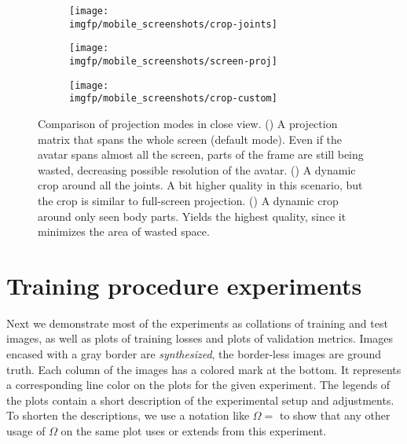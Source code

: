 \begin{figure}
	\centering
	\begin{subfigure}[b]{0.32\textwidth}
		\centering
		\texttt{[image: \\imgfp/mobile\_screenshots/crop-joints]}%
		\caption{}
		\label{fig:zoom_inefficient_crop}
	\end{subfigure}
	\hfill
	\begin{subfigure}[b]{0.32\textwidth}
		\centering
		\texttt{[image: \\imgfp/mobile\_screenshots/screen-proj]}
		\caption{}
		\label{fig:zoom_screen_crop}
	\end{subfigure}
	\hfill
	\begin{subfigure}[b]{0.32\textwidth}
		\centering
		\texttt{[image: \\imgfp/mobile\_screenshots/crop-custom]}
		\caption{}
		\label{fig:zoom_smallest_crop}
	\end{subfigure}
	\caption{Comparison of projection modes in close view. (\protect{}) A projection matrix that spans the whole screen (default mode). Even if the avatar spans almost all the screen, parts of the frame are still being wasted, decreasing possible resolution of the avatar. (\protect{}) A dynamic crop around all the joints. A bit higher quality in this scenario, but the crop is similar to full-screen projection. (\protect{}) A dynamic crop around only seen body parts. Yields the highest quality, since it minimizes the area of wasted space.}
\end{figure}
\clearpage
\newpage


\section{Training procedure experiments}
\label{appb:exps}

Next we demonstrate most of the experiments as collations of training and test images, as well as plots of training losses and plots of validation metrics. Images encased with a gray border are \textit{synthesized}, the border-less images are ground truth. Each column of the images has a colored mark at the bottom. It represents a corresponding line color on the plots for the given experiment. The legends of the plots contain a short description of the experimental setup and adjustments. To shorten the descriptions, we use a notation like $\Omega=$ to show that any other usage of $\Omega$ on the same plot uses or extends from this experiment. 

